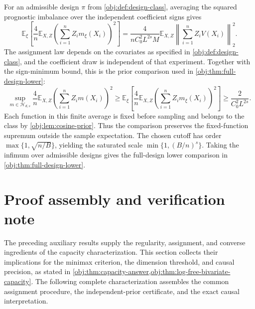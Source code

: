 \documentclass[11pt]{article}
\begin{document}
For an admissible design \(\pi\) from \cref{obj:def:design-class}, averaging the squared prognostic imbalance over the independent coefficient signs gives
\[
\mathbb E_\xi\!\left[
\frac4n\mathbb E_{X,Z}
\left(\sum_{i=1}^n Z_i m_\xi(X_i)\right)^2
\right]
=
\frac{4}{nC_0^2L^{2s}M}
\mathbb E_{X,Z}
\left\|\sum_{i=1}^n Z_iV(X_i)\right\|_2^2.
\]
The assignment law depends on the covariates as specified in \cref{obj:def:design-class}, and the coefficient draw is independent of that experiment. Together with the sign-minimum bound, this is the prior comparison used in \cref{obj:thm:full-design-lower}:
\[
\sup_{m\in\mathcal H_{d,s}}
\frac4n\mathbb E_{X,Z}
\left(\sum_{i=1}^n Z_i m(X_i)\right)^2
\geq
\mathbb E_\xi\!\left[
\frac4n\mathbb E_{X,Z}
\left(\sum_{i=1}^n Z_i m_\xi(X_i)\right)^2
\right]
\geq \frac{2}{C_0^2L^{2s}}.
\]
Each function in this finite average is fixed before sampling and belongs to the class by \cref{obj:lem:cosine-prior}. Thus the comparison preserves the fixed-function supremum outside the sample expectation. The chosen cutoff has order \(\max\{1,\sqrt{n/B}\}\), yielding the saturated scale \(\min\{1,(B/n)^s\}\). Taking the infimum over admissible designs gives the full-design lower comparison in \cref{obj:thm:full-design-lower}.


\section{Proof assembly and verification note}

The preceding auxiliary results supply the regularity, assignment, and converse ingredients of the capacity characterization. This section collects their implications for the minimax criterion, the dimension threshold, and causal precision, as stated in \cref{obj:thm:capacity-answer,obj:thm:log-free-bivariate-capacity}. The following complete characterization assembles the common assignment procedure, the independent-prior certificate, and the exact causal interpretation.
\end{document}
